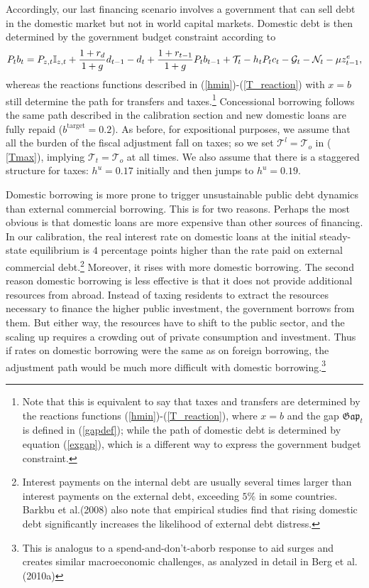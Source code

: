 \documentclass[11pt]{article}
\begin{document}
Accordingly, our last financing scenario involves a government that can sell
debt in the domestic market but not in world capital markets. Domestic debt
is then determined by the government budget constraint according to 
\begin{equation}
P_{t}b_{t}=P_{z,t}\mathbb{I}_{z,t}+\frac{1+r_{d}}{1+g}d_{t-1}-d_{t}+\frac{%
1+r_{t-1}}{1+g}P_{t}b_{t-1}+\mathcal{T}_{t}-h_{t}P_{t}c_{t}-\mathcal{G}_{t}-%
\mathcal{N}_{t}-\mu z_{t-1}^{e},  \label{domestic}
\end{equation}%
whereas the reactions functions described in (\ref{hmin})-(\ref{T_reaction})
with $x=b$ still determine the path for transfers and taxes.\footnote{%
Note that this is equivalent to say that taxes and transfers are determined
by the reactions functions (\ref{hmin})-(\ref{T_reaction}), where $x=b$ and
the gap $\mathfrak{Gap}_{t}$ is defined in (\ref{gapdef}); while the path of
domestic debt is determined by equation (\ref{exgap}), which is a different
way to express the government budget constraint.} Concessional borrowing
follows the same path described in the calibration section and new domestic
loans are fully repaid ($b^{\text{target}}=0.2$). As before, for
expositional purposes, we assume that all the burden of the fiscal
adjustment fall on taxes; so we set $\mathcal{T}^{l}=\mathcal{T}_{o}$ in (%
\ref{Tmax}), implying $\mathcal{T}_{t}=\mathcal{T}_{o}$ at all times. We
also assume that there is a staggered structure for taxes: $h^{u}=0.17$
initially and then jumps to $h^{u}=0.19.$

Domestic borrowing is more prone to trigger unsustainable public debt
dynamics than external commercial borrowing. This is for two reasons.
Perhaps the most obvious is that domestic loans are more expensive than
other sources of financing. In our calibration, the real interest rate on
domestic loans at the initial steady-state equilibrium is $4$ percentage
points higher than the rate paid on external commercial debt.\footnote{%
Interest payments on the internal debt are usually several times larger than
interest payments on the external debt, exceeding $5\%$ in some countries.
Barkbu et al.\thinspace (2008) also note that empirical studies find that
rising domestic debt significantly increases the likelihood of external debt
distress.} Moreover, it rises with more domestic borrowing. The second
reason domestic borrowing is less effective is that it does not provide
additional resources from abroad. Instead of taxing residents to extract the
resources necessary to finance the higher public investment, the government
borrows from them. But either way, the resources have to shift to the public
sector, and the scaling up requires a crowding out of private consumption
and investment. Thus if rates on domestic borrowing were the same as on
foreign borrowing, the adjustment path would be much more difficult with
domestic borrowing.\footnote{%
This is analogus to a spend-and-don't-aborb response to aid surges and
creates similar macroeconomic challenges, as analyzed in detail in Berg et
al. (2010a)}
\end{document}
